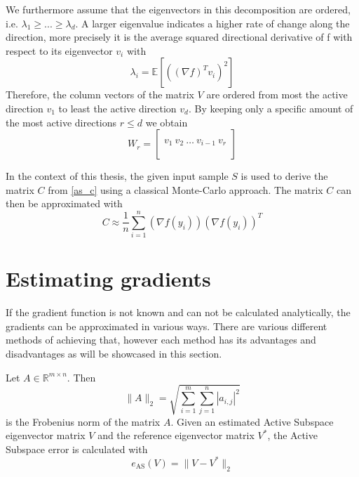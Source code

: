 \documentclass[
  a4paper,  %
  twoside,  %
  bibliography=totoc,
  headsepline,
  cleardoublepage=empty,
  parskip=half,
  draft=false
]{scrbook}
\begin{document}
We furthermore assume that the eigenvectors in this decomposition are ordered, i.e. $\lambda_1 \geq ... \geq \lambda_d$.
A larger eigenvalue indicates a higher rate of change along the direction, more precisely it is the average squared directional derivative of f with respect to its eigenvector $v_i$ \cite{CG14} with
\begin{equation}
\lambda_i=\mathds{E}[((\nabla f)^T v_i)^2]
\label{eigenvalues}
\end{equation}
Therefore, the column vectors of the matrix $V$ are ordered from most the active direction $v_1$ to least the active direction $v_d$.
By keeping only a specific amount of the most active directions $r \leq d$ we obtain
\begin{equation}
W_r=\begin{bmatrix}
  \\
    v_1 ~ v_2 ~ \dots ~ v_{i-1} ~ v_r\\
    \\
  \end{bmatrix}
\label{basis}
\end{equation}

In the context of this thesis, the given input sample $S$ is used to derive the matrix $C$ from \ref{as_c} using a classical Monte-Carlo approach.
The matrix $C$ can then be approximated with
\begin{equation}
C \approx \frac{1}{n} \sum_{i=1}^n  (\nabla f(y_i)) (\nabla f(y_i))^T
\nonumber
\end{equation}




\section{Estimating gradients}

If the gradient function is not known and can not be calculated analytically, the gradients can be approximated in various ways.
There are various different methods of achieving that, however each method has its advantages and disadvantages as will be showcased in this section.

\begin{definition}
Let $A \in \mathds{R}^{m \times n}$. Then
\begin{equation}
\| A\|_2=\sqrt{\sum_{i=1}^m \sum_{j=1}^n |a_{i,j}|^2}
\nonumber
\end{equation}
is the Frobenius norm of the matrix $A$.
Given an estimated Active Subspace eigenvector matrix $V$ and the reference eigenvector matrix $V^*$, the
Active Subspace error is calculated with
\begin{equation}
e_{\text{AS}}(V)=\| V - V^* \|_2
\nonumber
\end{equation}
\end{definition}
\end{document}
